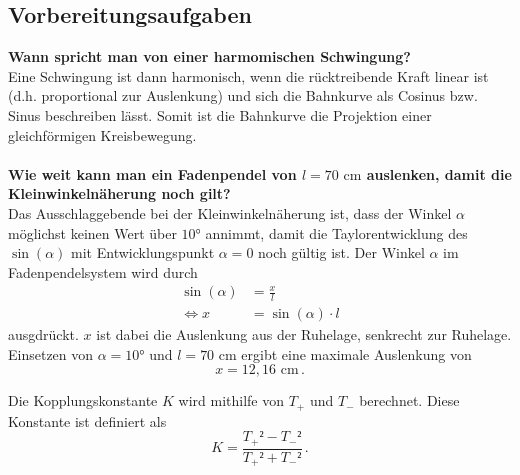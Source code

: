 \subsection{Vorbereitungsaufgaben}
\label{sec:Vorbereitungsaufgaben}
\textbf{Wann spricht man von einer harmomischen Schwingung?}\\
Eine Schwingung ist dann harmonisch, wenn die rücktreibende Kraft linear ist (d.h. proportional zur Auslenkung) und sich die Bahnkurve als 
Cosinus bzw. Sinus beschreiben lässt. Somit ist die Bahnkurve die Projektion einer gleichförmigen Kreisbewegung. 
\\
\\
\textbf{Wie weit kann man ein Fadenpendel von $l = 70 \,\,\unit{\centi\meter}$ auslenken, damit die Kleinwinkelnäherung noch gilt?}\\
Das Ausschlaggebende bei der Kleinwinkelnäherung ist, dass der Winkel $\alpha$ möglichst keinen Wert über $10°$ annimmt,
damit die Taylorentwicklung des $\sin(\alpha)$ mit Entwicklungspunkt $\alpha = 0$ noch gültig ist. 
Der Winkel $\alpha$ im Fadenpendelsystem wird durch
\begin{align*}
    \sin(\alpha) &= \frac{x}{l} \\
    \Leftrightarrow x &= \sin(\alpha) \cdot l
\end{align*}
ausgdrückt. $x$ ist dabei die Auslenkung aus der Ruhelage, senkrecht zur Ruhelage. \\
Einsetzen von $\alpha = 10°$ und $l = 70 \,\, \unit{\centi\meter}$ ergibt eine maximale Auslenkung von $$x = 12,16 \,\, \unit{\centi\meter}\,.$$

Die Kopplungskonstante $K$ wird mithilfe von $T_+$ und $T_-$ berechnet. Diese Konstante ist definiert als 
\begin{equation}
    K = \frac{T_{+}² - T_{-}²}{T_{+}² + T_{-}²}\, .
\end{equation}

